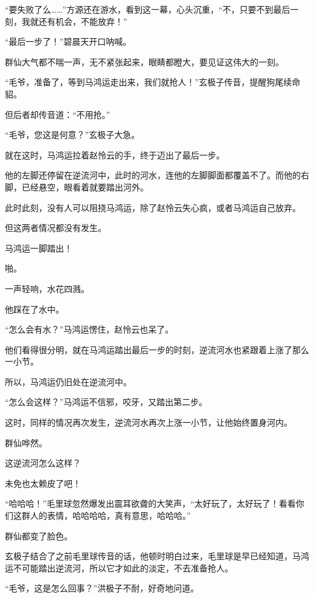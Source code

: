 
\begin{this_body}



“要失败了么……”方源还在游水，看到这一幕，心头沉重，“不，只要不到最后一刻，我就还有机会，不能放弃！”

“最后一步了！”碧晨天开口呐喊。

群仙大气都不喘一声，无不紧张起来，眼睛都瞪大，要见证这伟大的一刻。

“毛爷，准备了，等到马鸿运走出来，我们就抢人！”玄极子传音，提醒狗尾续命貂。

但后者却传音道：“不用抢。”

“毛爷，您这是何意？”玄极子大急。

就在这时，马鸿运拉着赵怜云的手，终于迈出了最后一步。

他的左脚还停留在逆流河中，此时的河水，连他的左脚脚面都覆盖不了。而他的右脚，已经悬空，眼看着就要踏出河外。

此时此刻，没有人可以阻挠马鸿运，除了赵怜云失心疯，或者马鸿运自己放弃。

但这两者情况都没有发生。

马鸿运一脚踏出！

啪。

一声轻响，水花四溅。

他踩在了水中。

“怎么会有水？”马鸿运愣住，赵怜云也呆了。

他们看得很分明，就在马鸿运踏出最后一步的时刻，逆流河水也紧跟着上涨了那么一小节。

所以，马鸿运仍旧处在逆流河中。

“怎么会这样？”马鸿运不信邪，咬牙，又踏出第二步。

这时，同样的情况再次发生，逆流河水再次上涨一小节，让他始终置身河内。

群仙哗然。

这逆流河怎么这样？

未免也太赖皮了吧！

“哈哈哈！”毛里球忽然爆发出震耳欲聋的大笑声，“太好玩了，太好玩了！看看你们这群人的表情，哈哈哈哈，真有意思，哈哈哈。”

群仙都变了脸色。

玄极子结合了之前毛里球传音的话，他顿时明白过来，毛里球是早已经知道，马鸿运不可能踏出逆流河，所以它才如此的淡定，不去准备抢人。

“毛爷，这是怎么回事？”洪极子不耐，好奇地问道。


\end{this_body}
